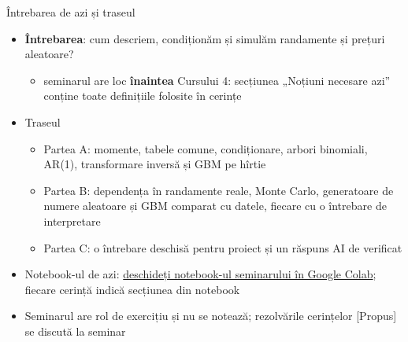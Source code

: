 \begin{frame}{Întrebarea de azi și traseul}
\itemsize{\small}
\begin{itemize}
    \item \textbf{Întrebarea}: cum descriem, condiționăm și simulăm randamente și prețuri aleatoare?
    \begin{itemize}
        \item seminarul are loc \textbf{înaintea} Cursului 4: secțiunea „Noțiuni necesare azi” conține toate definițiile folosite în cerințe
    \end{itemize}
    \item Traseul
    \begin{itemize}
        \item Partea A: momente, tabele comune, condiționare, arbori binomiali, AR(1), transformare inversă și GBM pe hîrtie
        \item Partea B: dependența în randamente reale, Monte Carlo, generatoare de numere aleatoare și GBM comparat cu datele, fiecare cu o întrebare de interpretare
        \item Partea C: o întrebare deschisă pentru proiect și un răspuns AI de verificat
    \end{itemize}
    \item Notebook-ul de azi: \href{\nb}{deschideți notebook-ul seminarului în Google Colab}; fiecare cerință indică secțiunea din notebook
    \item Seminarul are rol de exercițiu și nu se notează; rezolvările cerințelor [Propus] se discută la seminar
\end{itemize}
\end{frame}

